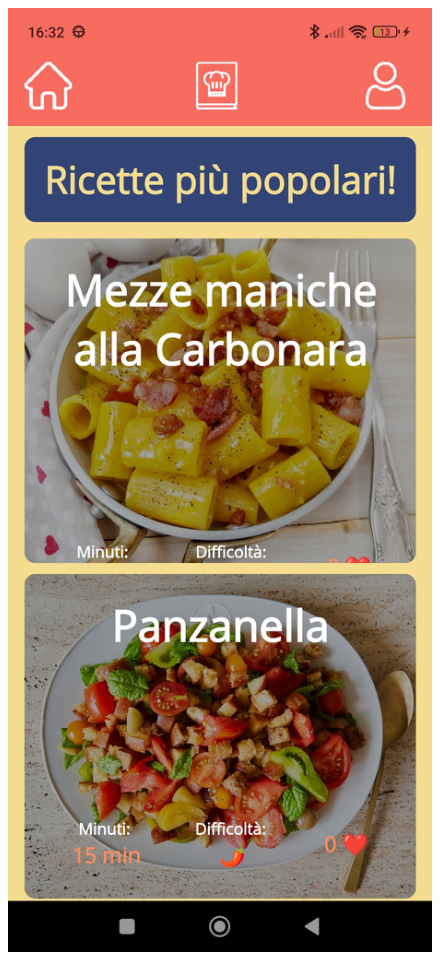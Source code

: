 ﻿\documentclass[a4paper,12pt]{report}
\begin{document}
\begin{figure}[h!]
    \begin{minipage}{.5\textwidth}
        \centering
        \includegraphics[width=0.9\linewidth]{app_images/HomePage.jpg}
    \end{minipage}

\end{figure}
\end{document}
